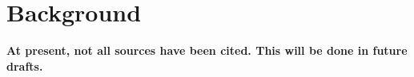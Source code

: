 \section{Background}

\textbf{At present, not all sources have been cited. This will be done in future drafts.}












